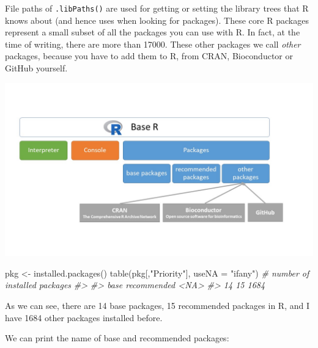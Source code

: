 \documentclass[
]{book}
\newenvironment{Shaded}{\begin{snugshade}}{\end{snugshade}}
\newcommand{\AttributeTok}[1]{\textcolor[rgb]{0.77,0.63,0.00}{#1}}
\newcommand{\CommentTok}[1]{\textcolor[rgb]{0.56,0.35,0.01}{\textit{#1}}}
\newcommand{\FunctionTok}[1]{\textcolor[rgb]{0.00,0.00,0.00}{#1}}
\newcommand{\NormalTok}[1]{#1}
\newcommand{\OtherTok}[1]{\textcolor[rgb]{0.56,0.35,0.01}{#1}}
\newcommand{\StringTok}[1]{\textcolor[rgb]{0.31,0.60,0.02}{#1}}
\begin{document}
File paths of \texttt{.libPaths()} are used for getting or setting the library trees that R knows about (and hence uses when looking for packages). These core R packages represent a small subset of all the packages you can use with R. In fact, at the time of writing, there are more than 17000. These other packages we call \emph{other} packages, because
you have to add them to R, from CRAN, Bioconductor or GitHub yourself.

\includegraphics[width=1\linewidth]{img/baser_packages}

\begin{Shaded}
\begin{Highlighting}[]
\NormalTok{pkg }\OtherTok{\textless{}{-}} \FunctionTok{installed.packages}\NormalTok{()               }
\FunctionTok{table}\NormalTok{(pkg[,}\StringTok{"Priority"}\NormalTok{], }\AttributeTok{useNA =} \StringTok{"ifany"}\NormalTok{) }\CommentTok{\# number of installed packages}
\CommentTok{\#\textgreater{} }
\CommentTok{\#\textgreater{}        base recommended        \textless{}NA\textgreater{} }
\CommentTok{\#\textgreater{}          14          15        1684}
\end{Highlighting}
\end{Shaded}

As we can see, there are 14 base packages, 15 recommended packages in R, and I have 1684 other packages installed before.

We can print the name of base and recommended packages:
\end{document}
